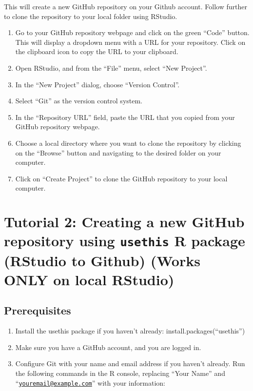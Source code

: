 \documentclass[
]{book}
\begin{document}
This will create a new GitHub repository on your Github account. Follow further to clone the repository to your local folder using RStudio.

\begin{enumerate}
\def\labelenumi{\arabic{enumi}.}
\item
  Go to your GitHub repository webpage and click on the green ``Code'' button. This will display a dropdown menu with a URL for your repository. Click on the clipboard icon to copy the URL to your clipboard.
\item
  Open RStudio, and from the ``File'' menu, select ``New Project''.
\item
  In the ``New Project'' dialog, choose ``Version Control''.
\item
  Select ``Git'' as the version control system.
\item
  In the ``Repository URL'' field, paste the URL that you copied from your GitHub repository webpage.
\item
  Choose a local directory where you want to clone the repository by clicking on the ``Browse'' button and navigating to the desired folder on your computer.
\item
  Click on ``Create Project'' to clone the GitHub repository to your local computer.
\end{enumerate}

\hypertarget{tutorial-2-creating-a-new-github-repository-using-usethis-r-package-rstudio-to-github-works-only-on-local-rstudio}{%
\section{\texorpdfstring{Tutorial 2: Creating a new GitHub repository using \texttt{usethis} R package (RStudio to Github) (Works ONLY on local RStudio)}{Tutorial 2: Creating a new GitHub repository using usethis R package (RStudio to Github) (Works ONLY on local RStudio)}}\label{tutorial-2-creating-a-new-github-repository-using-usethis-r-package-rstudio-to-github-works-only-on-local-rstudio}}

\hypertarget{prerequisites}{%
\subsection{Prerequisites}\label{prerequisites}}

\begin{enumerate}
\def\labelenumi{\arabic{enumi}.}
\item
  Install the usethis package if you haven't already: install.packages(``usethis'')
\item
  Make sure you have a GitHub account, and you are logged in.
\item
  Configure Git with your name and email address if you haven't already. Run the following commands in the R console, replacing ``Your Name'' and ``\href{mailto:youremail@example.com}{\nolinkurl{youremail@example.com}}'' with your information:
\end{enumerate}
\end{document}
